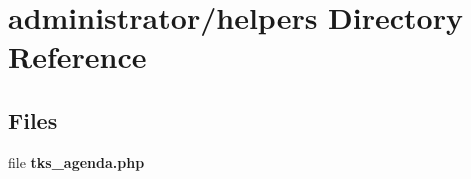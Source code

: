 \section{administrator/helpers Directory Reference}
\label{dir_681074ecf01284743de21fbdfe29dc2a}
\subsection*{Files}
\begin{DoxyCompactItemize}
\item 
file \textbf{ tks\+\_\+agenda.\+php}
\end{DoxyCompactItemize}
